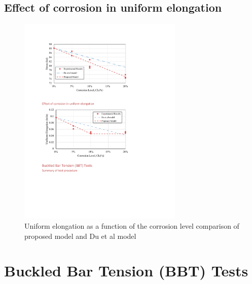 \subsection{Effect of corrosion in uniform elongation}

\begin{figure}[htbp]
	\centering
	\includegraphics[width=0.7\textwidth]{VAC Thesis 2.0/Chapter-4/figs/TensionTest_results_4_proposedmodel.pdf}
	\caption{Uniform elongation as a function of the corrosion level comparison of proposed model and Du et al model \cite{Du2005}}
	\label{fig:TensionTestResults_StressStrain}
\end{figure}

\section{Buckled Bar Tension (BBT) Tests}

